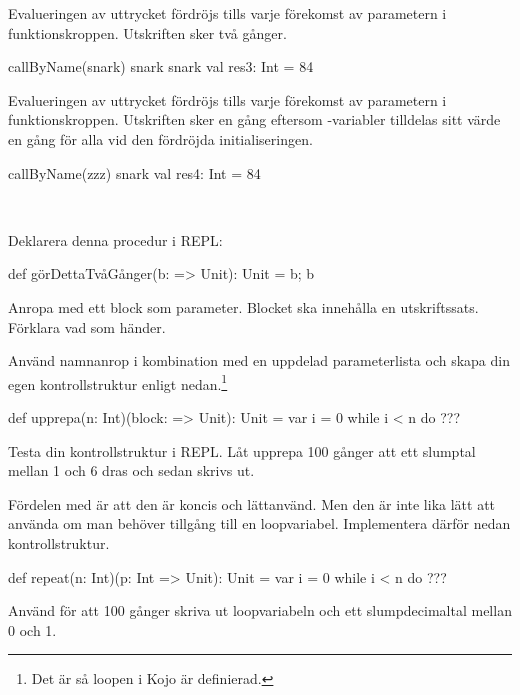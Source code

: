 \SubtaskSolved Evalueringen av uttrycket  fördröjs tills varje förekomst av parametern  i funktionskroppen. Utskriften sker två gånger.
\begin{REPL}
callByName(snark)
snark snark val res3: Int = 84
\end{REPL}

\SubtaskSolved Evalueringen av uttrycket  fördröjs tills varje förekomst av parametern  i funktionskroppen. Utskriften sker en gång eftersom -variabler tilldelas sitt värde en gång för alla vid den fördröjda initialiseringen.
\begin{REPL}
callByName(zzz)
snark val res4: Int = 84
\end{REPL}

\QUESTEND





\QUESTBEGIN

\Task  \what~

\Subtask Deklarera denna procedur i REPL:
\begin{Code}
def görDettaTvåGånger(b: => Unit): Unit = { b; b }
\end{Code}

\Subtask Anropa  med ett block som parameter. Blocket ska innehålla en utskriftssats. Förklara vad som händer.

\Subtask Använd namnanrop i kombination med en uppdelad parameterlista och skapa din egen kontrollstruktur enligt nedan.\footnote{Det är så loopen  i Kojo är definierad.}
\begin{Code}
def upprepa(n: Int)(block: => Unit): Unit =
  var i = 0
  while i < n do 
    ???
\end{Code}

\Subtask
Testa din kontrollstruktur i REPL. Låt upprepa 100 gånger att ett slumptal mellan 1 och 6 dras och sedan skrivs ut.

\Subtask Fördelen med  är att den är koncis och lättanvänd. Men den är inte lika lätt att använda om man behöver tillgång till en loopvariabel. Implementera därför nedan kontrollstruktur.

\begin{Code}
def repeat(n: Int)(p: Int => Unit): Unit = 
  var i = 0
  while i < n do
    ??? 
\end{Code}

\Subtask Använd  för att 100 gånger skriva ut loopvariabeln och ett slumpdecimaltal mellan 0 och 1.


